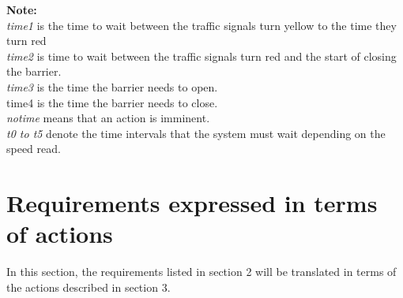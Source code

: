 \documentclass[10pt,a4paper]{article}
\begin{document}
\textbf{Note:}
\\ \textit{time1} is the time to wait between the traffic signals turn yellow to the time they turn red
\\ \textit{time2} is time to wait between the traffic signals turn red and the start of closing the barrier.
\\ \textit{time3} is the time the barrier needs to open.\\time4 is the time the barrier needs to close.
\\ \textit{notime} means that an action is imminent.
\\ \textit{t0 to t5} denote the time intervals that the system must wait depending on the speed read.


\clearpage

\newpage

\section{Requirements expressed in terms of actions}

In this section, the requirements listed in section 2 will be translated in terms of the actions described in section 3. \\
\end{document}
